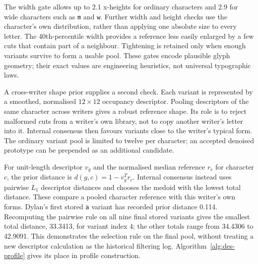 The width gate allows up to 2.1 x-heights for ordinary characters and 2.9 for wide characters such as \texttt{m} and \texttt{w}. Further width and height checks use the character's own distribution, rather than applying one absolute size to every letter. The 40th-percentile width provides a reference less easily enlarged by a few cuts that contain part of a neighbour. Tightening is retained only when enough variants survive to form a usable pool. These gates encode plausible glyph geometry; their exact values are engineering heuristics, not universal typographic laws.

A cross-writer shape prior supplies a second check. Each variant is represented by a smoothed, normalised $12\times12$ occupancy descriptor. Pooling descriptors of the same character across writers gives a robust reference shape. Its role is to reject malformed cuts from a writer's own library, not to copy another writer's letter into it. Internal consensus then favours variants close to the writer's typical form. The ordinary variant pool is limited to twelve per character; an accepted denoised prototype can be prepended as an additional candidate.

For unit-length descriptor $v_g$ and the normalised median reference $r_c$ for character $c$, the prior distance is $d(g,c)=1-v_g^Tr_c$. Internal consensus instead uses pairwise $L_1$ descriptor distances and chooses the medoid with the lowest total distance. These compare a pooled character reference with this writer's own forms. Dylan's first stored \texttt{a} variant has recorded prior distance 0.114. Recomputing the pairwise rule on all nine final stored variants gives the smallest total distance, 33.3413, for variant index 4; the other totals range from 34.4306 to 42.9091. This demonstrates the selection rule on the final pool, without treating a new descriptor calculation as the historical filtering log. Algorithm~\ref{alg:des-profile} gives its place in profile construction.

